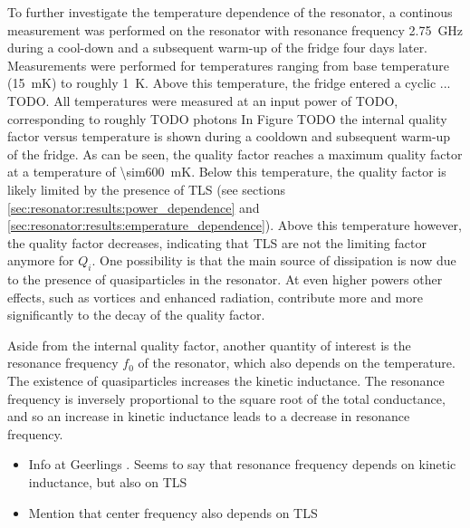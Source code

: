 \documentclass[12pt]{report}
\begin{document}
To further investigate the temperature dependence of the resonator, a continous measurement was performed on the resonator with resonance frequency \SI{2.75}{\giga \hertz} during a cool-down and a subsequent warm-up of the fridge four days later. Measurements were performed for temperatures ranging from base temperature (\SI{15}{\milli \kelvin}) to roughly \SI{1}{\kelvin}. Above this temperature, the fridge entered a cyclic ... TODO. All temperatures were measured at an input power of TODO, corresponding to roughly TODO photons In Figure TODO the internal quality factor versus temperature is shown during a cooldown and subsequent warm-up of the fridge. As can be seen, the quality factor reaches a maximum quality factor at a temperature of \SI{\sim600}{\milli \kelvin}. Below this temperature, the quality factor is likely limited by the presence of TLS (see sections \ref{sec:resonator:results:power_dependence} and \ref{sec:resonator:results:emperature_dependence}). Above this temperature however, the quality factor decreases, indicating that TLS are not the limiting factor anymore for $Q_i$. One possibility is that the main source of dissipation is now due to the presence of quasiparticles in the resonator. At even higher powers other effects, such as vortices and enhanced radiation, contribute more and more significantly to the decay of the quality factor.


Aside from the internal quality factor, another quantity of interest is the resonance frequency $f_0$ of the resonator, which also depends on the temperature. The existence of quasiparticles increases the kinetic inductance. The resonance frequency is inversely proportional to the square root of the total conductance, and so an increase in kinetic inductance leads to a decrease in resonance frequency.



\begin{itemize}
    \item Info at Geerlings \cite[p.~106]{Geerlings}. Seems to say that resonance frequency depends on kinetic inductance, but also on TLS
    \item Mention that center frequency also depends on TLS
\end{itemize}
\end{document}
